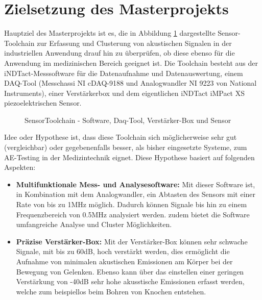 \documentclass[twoside, 12pt, a4paper]{article}
\begin{document}
	
	\section{Zielsetzung des Masterprojekts}
	
	
	Hauptziel des Masterprojekts ist es, die in Abbildung \ref{img:SensorToolchain} dargestellte Sensor-Toolchain zur Erfassung und Clusterung von akustischen Signalen in der industriellen Anwendung drauf hin zu \"uberpr\"ufen, ob diese ebenso f\"ur die Anwendung im medizinischen Bereich geeignet ist. Die Toolchain besteht aus der iNDTact-Messsoftware f\"ur die Datenaufnahme und Datenauswertung, einem DAQ-Tool (Messchassi NI cDAQ-9188 und Analogwandler NI 9223 von National Instruments), einer Verst\"arkerbox und dem eigentlichen iNDTact iMPact XS piezoelektrischen Sensor.
	  
	
		\begin{figure}[!htbp]
		\centering
		\setlength{\fboxsep}{0.5pt}
		\setlength{\fboxrule}{0.5pt}
		\caption[SensorToolchain]{SensorToolchain - Software, Daq-Tool, Verst\"arker-Box und Sensor}
		\label{img:SensorToolchain}
		\end{figure}
		\FloatBarrier   
	
	Idee oder Hypothese ist, dass diese Toolchain sich m\"oglicherweise sehr gut (vergleichbar) oder gegebenenfalls besser, als bisher eingesetzte Systeme, zum AE-Testing in der Medizintechnik eignet. Diese Hypothese basiert auf folgenden Aspekten: 
	
	\begin{itemize}
		\item{\textbf{Multifunktionale Mess- und Analysesoftware:} Mit dieser Software ist, in Kombination mit dem Analogwandler, ein Abtasten des Sensors mit einer Rate von bis zu 1MHz m\"oglich. Dadurch k\"onnen Signale bis hin zu einem Frequenzbereich von 0.5MHz analysiert werden. zudem bietet die Software umfangreiche Analyse und Cluster M\"oglichkeiten.}
		\item{\textbf{Pr\"azise Verst\"arker-Box:} Mit der Verst\"arker-Box k\"onnen sehr schwache Signale, mit bis zu 60dB, hoch verst\"arkt werden, dies erm\"oglicht die Aufnahme von minimalen akustischen Emissionen am K\"orper bei der Bewegung von Gelenken. Ebenso kann \"uber das einstellen einer geringen Verst\"arkung von -40dB sehr hohe akusstische Emissionen erfasst werden, welche zum beispiellos beim Bohren von Knochen entstehen.}	
	\end{itemize} 
\end{document}
